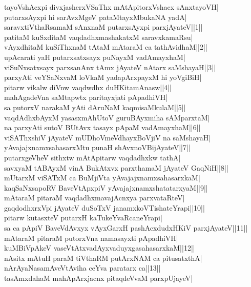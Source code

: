 \documentclass{article}
\begin{document}
tayoVshAcxpi divxjasherxVSaThx mAtApitorxVshacx sAnxtayoVH|\\
putarxsAyxpi hi sarAvxMgeV pataMtayxMbukaNA yadA|\\
saravxtiVthaRsamaM sAnxnaM putarxsAyxpi parxjAyateV||1||\\
patitaM kuSxditaM vaqdadhxmashakatxM saravxkamaRsu|\\
vAyxdhitaM kuSiThxnaM tAtaM mAtaraM ca tathAvidhaM||2||\\
upAcarati yaH putarxsatxsayx puNayxM vadAmayxhaM|\\
viSuNxsatxsayx parxsanAnx tAmx jAyateV nAtarx saMshayaH||3||\\
parxyAti veYSaNxvaM loVkaM yadapArxpayxM hi yoVgiBiH|\\
pitarw vikalw diVnw vaqdwdhx duHKitamAnasw||4||\\
mahAgadeVna saMtapwtx paritayxjati pApadhiVH|\\
sa putorxV narakaM yAti dAruNaM kaqmisaMkulaM||5||\\
vaqdAdhxbAyxM yasasxmAhUtoV guruBAyxmiha sAMparxtaM|\\
na parxyAti sutoV BUtAvx tasayx pApaM vadAmayxhaM||6||\\
viSAThxshiV jAyateV mUDhoVmeVdhayxBoVjiV na saMshayaH|\\
yAvajajxnamxsahasarxMtu punaH shAvxnoVBijAyateV||7||\\
putarxgeVheV sithxtw mAtApitarw vaqdadhxkw tathA|\\
savxyaM tABAyxM vinA BukAtxvx parxthamaM jAyateV GaqNiH||8||\\
mUtarxM viSATxM ca BuMjiVta yAvajajxnamxsahasarxkaM|\\
kaqSaNxsapoRV BaveVtApxpiV yAvajajxnamxshatatarxyaM||9||\\
mAtaraM pitaraM vaqdadhxmavajAcnxya parxvataRteV|\\
gaqdodhxrxVpi jAyateV duSoTxV janamxkoVTishateYrapi||10||\\
pitarw kutasxteV putarxH kaTukeYvaRcaneYrapi|\\
sa ca pApiV BaveVdAvxyx vAyxGarxH pashAcxdudxHKiV parxjAyateV||11||\\
mAtaraM pitaraM putorxVna namasayxti pApadhiVH|\\
kuMBiVpAkeV vaseVtAtxvadAyxvaduyxgasahasarxkaM||12||\\
nAsitx mAtuH paraM tiVthaRM putArxNAM ca pitusatxthA|\\
nArAyaNasamAveVtAviha ceYva paratarx ca||13||\\
tasAmxdahaM mahApArxjacnx pitaqdeVvaM parxpUjayeV|\\
\end{document}
